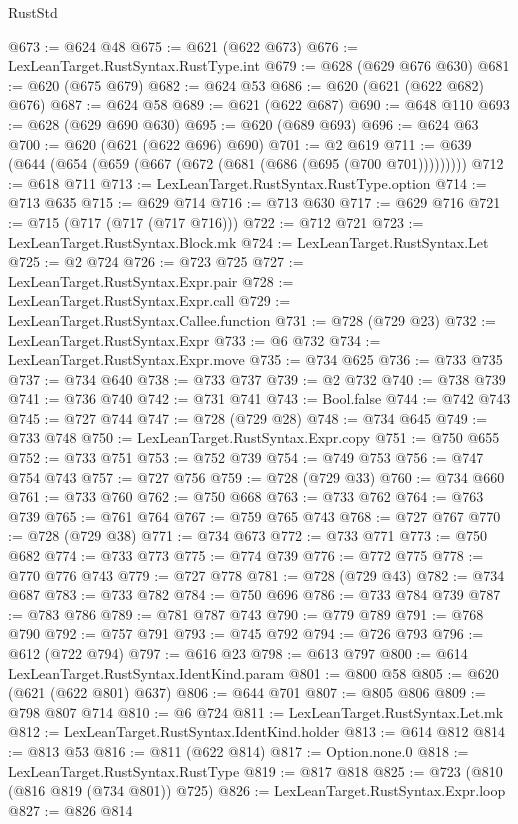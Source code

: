 \begin{lexlean}{RustStd}
\begin{coremodule}
@673 := @624 @48
@675 := @621 (@622 @673)
@676 := LexLeanTarget.RustSyntax.RustType.int
@679 := @628 (@629 @676 @630)
@681 := @620 (@675 @679)
@682 := @624 @53
@686 := @620 (@621 (@622 @682) @676)
@687 := @624 @58
@689 := @621 (@622 @687)
@690 := @648 @110
@693 := @628 (@629 @690 @630)
@695 := @620 (@689 @693)
@696 := @624 @63
@700 := @620 (@621 (@622 @696) @690)
@701 := @2 @619
@711 := @639 (@644 (@654 (@659 (@667 (@672 (@681 (@686 (@695 (@700 @701)))))))))
@712 := @618 @711
@713 := LexLeanTarget.RustSyntax.RustType.option
@714 := @713 @635
@715 := @629 @714
@716 := @713 @630
@717 := @629 @716
@721 := @715 (@717 (@717 (@717 @716)))
@722 := @712 @721
@723 := LexLeanTarget.RustSyntax.Block.mk
@724 := LexLeanTarget.RustSyntax.Let
@725 := @2 @724
@726 := @723 @725
@727 := LexLeanTarget.RustSyntax.Expr.pair
@728 := LexLeanTarget.RustSyntax.Expr.call
@729 := LexLeanTarget.RustSyntax.Callee.function
@731 := @728 (@729 @23)
@732 := LexLeanTarget.RustSyntax.Expr
@733 := @6 @732
@734 := LexLeanTarget.RustSyntax.Expr.move
@735 := @734 @625
@736 := @733 @735
@737 := @734 @640
@738 := @733 @737
@739 := @2 @732
@740 := @738 @739
@741 := @736 @740
@742 := @731 @741
@743 := Bool.false
@744 := @742 @743
@745 := @727 @744
@747 := @728 (@729 @28)
@748 := @734 @645
@749 := @733 @748
@750 := LexLeanTarget.RustSyntax.Expr.copy
@751 := @750 @655
@752 := @733 @751
@753 := @752 @739
@754 := @749 @753
@756 := @747 @754 @743
@757 := @727 @756
@759 := @728 (@729 @33)
@760 := @734 @660
@761 := @733 @760
@762 := @750 @668
@763 := @733 @762
@764 := @763 @739
@765 := @761 @764
@767 := @759 @765 @743
@768 := @727 @767
@770 := @728 (@729 @38)
@771 := @734 @673
@772 := @733 @771
@773 := @750 @682
@774 := @733 @773
@775 := @774 @739
@776 := @772 @775
@778 := @770 @776 @743
@779 := @727 @778
@781 := @728 (@729 @43)
@782 := @734 @687
@783 := @733 @782
@784 := @750 @696
@786 := @733 @784 @739
@787 := @783 @786
@789 := @781 @787 @743
@790 := @779 @789
@791 := @768 @790
@792 := @757 @791
@793 := @745 @792
@794 := @726 @793
@796 := @612 (@722 @794)
@797 := @616 @23
@798 := @613 @797
@800 := @614 LexLeanTarget.RustSyntax.IdentKind.param
@801 := @800 @58
@805 := @620 (@621 (@622 @801) @637)
@806 := @644 @701
@807 := @805 @806
@809 := @798 @807 @714
@810 := @6 @724
@811 := LexLeanTarget.RustSyntax.Let.mk
@812 := LexLeanTarget.RustSyntax.IdentKind.holder
@813 := @614 @812
@814 := @813 @53
@816 := @811 (@622 @814)
@817 := Option.none.{0}
@818 := LexLeanTarget.RustSyntax.RustType
@819 := @817 @818
@825 := @723 (@810 (@816 @819 (@734 @801)) @725)
@826 := LexLeanTarget.RustSyntax.Expr.loop
@827 := @826 @814

\end{coremodule}
\end{lexlean}
